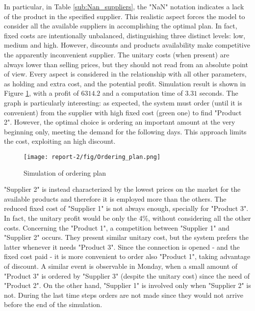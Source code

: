 \documentclass{article}
\begin{document}
In particular, in Table \ref{sub:Nan_suppliers}, the "NaN" notation indicates a lack of the product in the specified supplier. This realistic aspect forces the model to consider all the available suppliers in accomplishing the optimal plan. In fact, fixed costs are intentionally unbalanced, distinguishing three distinct levels: low, medium and high. However, discounts and products availability make competitive the apparently inconvenient supplier.
The unitary costs (when present) are always lower than selling prices, but they should not read from an absolute point of view. Every aspect is considered in the relationship with all other parameters, as holding and extra cost, and the potential profit.
Simulation result is shown in Figure \ref{fig:simulation}, with a profit of $6314.2$ \EUR{} and a computation time of $3.31$  seconds. 
\newpage
The graph is particularly interesting: as expected, the system must order (until it is convenient) from the supplier with high fixed cost (green one) to find "Product 2". However, the optimal choice is ordering an important amount at the very beginning only, meeting the demand for the following days. This approach limits the cost, exploiting an high discount.\par
\begin{figure}[!htb]
\vspace{20pt}
    \centering
    \texttt{[image: report-2/fig/Ordering\_plan.png]}
    \caption{Simulation of ordering plan}
    \label{fig:simulation}
    \vspace{20pt}
\end{figure}
\noindent
"Supplier 2" is instead characterized by the lowest prices on the market for the available products and therefore it is employed more than the others. The reduced fixed cost of "Supplier 1" is not always enough, specially for "Product 3". In fact, the unitary profit would be only the 4\%, without considering all the other costs. 
Concerning the "Product 1", a competition between "Supplier 1" and "Supplier 2" occurs. They present similar unitary cost, but the system prefers the latter whenever it needs "Product 3". Since the connection is opened - and the fixed cost paid - it is more convenient to order also "Product 1", taking advantage of discount. A similar event is observable in Monday, when a small amount of "Product 3" is ordered by "Supplier 3" (despite the unitary cost) since the need of "Product 2". On the other hand, "Supplier 1" is involved only when "Supplier 2" is not. During the last time steps orders are not made since they would not arrive before the end of the simulation.
\newpage
\end{document}
